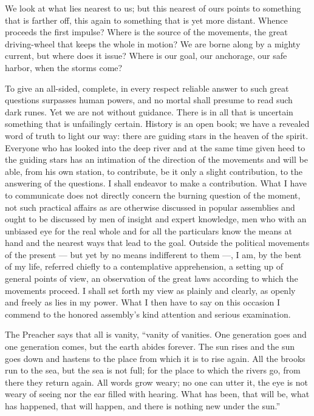 \documentclass[12pt,a4paper,openany]{book}
\newcommand{\opage}[1]{\marginnote{\footnotesize\textit{[#1]}}}
\begin{document}
We look at what lies nearest to us; but this
nearest of ours points to something that is farther off,
this again to something that is yet more distant. Whence
proceeds the first impulse? Where is the source of the movements,
the great driving-wheel that keeps the whole in motion?
We are borne along by a mighty current, but where does it
issue? Where is our goal, our anchorage, our safe
harbor, when the storms come?

To give an all-sided, complete, in every respect reliable
answer to such great questions
\setcounter{footnote}{0}%
\opage{2}surpasses human powers, and no mortal shall presume
to read such dark runes. Yet we are not without
guidance. There is in all that is uncertain something
that is unfailingly certain. History is an open
book; we have a revealed word of truth to light
our way: there are guiding stars in the heaven of the spirit.
Everyone who has looked into the deep river and at the same time given heed
to the guiding stars has an intimation of the direction
of the movements and will be able, from his own station, to contribute,
be it only a slight contribution, to the answering of the
questions. I shall endeavor to make a contribution.
What I have to communicate does not directly concern
the burning question of the moment, not such
practical affairs as are otherwise
discussed in popular assemblies and ought to be discussed by men of insight and expert knowledge,
men who with an unbiased eye for the real
whole and for all the particulars know the means at hand
and the nearest ways that lead to the goal.
Outside the political movements of the present
--- but yet by no means indifferent to them ---, I am, by the bent of my life,
referred chiefly to a contemplative apprehension,
a setting up of general points of view, an observation of
the great laws according to which the movements proceed. I
shall set forth my view as plainly and clearly, as
openly and freely as lies in my power. What I then
have to say on this occasion I commend to
the honored assembly's kind attention and
serious examination.

The Preacher says that all is vanity, ``vanity of vanities. One generation goes and one
generation comes, but the earth abides forever. The sun
rises and the sun goes down and hastens to the place
\setcounter{footnote}{0}%
\opage{3}from which it is to rise again. All the brooks run to the
sea, but the sea is not full; for the place to which
the rivers go, from there they return again. All
words grow weary; no one can utter it, the eye is not
weary of seeing nor the ear filled with hearing. What
has been, that will be, what has happened, that will
happen, and there is nothing new under the sun.''
\end{document}
